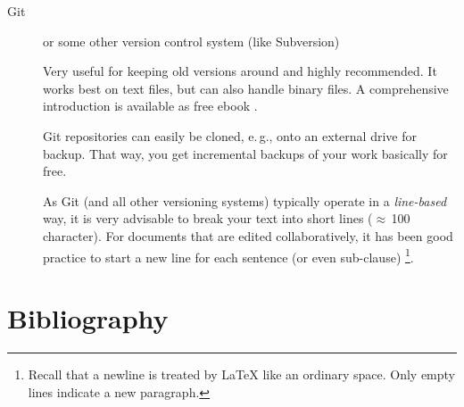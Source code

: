 \documentclass[]{rptuseminar}
\begin{document}
\begin{description}
	\item[Git] or some other version control system (like Subversion)

		Very useful for keeping old versions around and highly recommended.
		It works best on text files, but can also handle binary files.
		A comprehensive introduction is available as free ebook \cite{gitbook}.

		Git repositories can easily be cloned, e.\,g., onto an external drive for backup.
		That way, you get incremental backups of your work basically for free.

		As Git (and all other versioning systems) typically operate in a \emph{line-based} way,
		it is very advisable to break your text into short lines ($\approx$\,100 character).
		For documents that are edited collaboratively, it has been good practice to start a new line for each sentence (or even sub-clause)%
		\footnote{%
		  Recall that a newline is treated by \LaTeX{} like an ordinary space.
		  Only empty lines indicate a new paragraph.
		}.

\end{description}


\section{Bibliography}

\newpage
\nocite{*}



\end{document}
